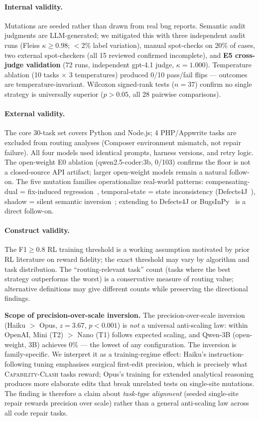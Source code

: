 \documentclass[sigconf,review,anonymous]{acmart}
\newcommand{\ccbench}{\textsc{Capability-Clash}}
\begin{document}
\paragraph{Internal validity.} Mutations are seeded rather than drawn from real bug reports. Semantic audit judgments are LLM-generated; we mitigated this with three independent audit runs (Fleiss $\kappa \geq 0.98$; $<$2\% label variation), manual spot-checks on 20\% of cases, two external spot-checkers (all 15 reviewed confirmed incomplete), and \textbf{E5 cross-judge validation} (72 runs, independent gpt-4.1 judge, $\kappa = 1.000$). Temperature ablation (10 tasks $\times$ 3 temperatures) produced 0/10 pass/fail flips — outcomes are temperature-invariant. Wilcoxon signed-rank tests ($n=37$) confirm no single strategy is universally superior ($p>0.05$, all 28 pairwise comparisons).

\paragraph{External validity.} The core 30-task set covers Python and Node.js; 4 PHP/Appwrite tasks are excluded from routing analyses (Composer environment mismatch, not repair failure). All four models used identical prompts, harness versions, and retry logic. The open-weight E0 ablation (qwen2.5-coder:3b, 0/103) confirms the floor is not a closed-source API artifact; larger open-weight models remain a natural follow-on. The five mutation families operationalize real-world patterns: compensating-dual = fix-induced regression~\cite{yin2011fixes}, temporal-state = state inconsistency (Defects4J~\cite{just2014defects4j}), shadow = silent semantic inversion~\cite{qi2015overfitting}; extending to Defects4J or BugsInPy~\cite{widyasari2020bugsinpy} is a direct follow-on.

\paragraph{Construct validity.} The F1$\geq$0.8 RL training threshold is a working assumption motivated by prior RL literature on reward fidelity; the exact threshold may vary by algorithm and task distribution. The ``routing-relevant task'' count (tasks where the best strategy outperforms the worst) is a conservative measure of routing value; alternative definitions may give different counts while preserving the directional findings.

\textbf{Scope of precision-over-scale inversion.} The precision-over-scale inversion (Haiku $>$ Opus, $z=3.67$, $p<0.001$) is \emph{not} a universal anti-scaling law: within OpenAI, Mini (T2) $>$ Nano (T1) follows expected scaling, and Qwen-3B (open-weight, 3B) achieves 0\% — the lowest of any configuration. The inversion is family-specific. We interpret it as a training-regime effect: Haiku's instruction-following tuning emphasises surgical first-edit precision, which is precisely what \ccbench{} tasks reward; Opus's training for extended analytical reasoning produces more elaborate edits that break unrelated tests on single-site mutations. The finding is therefore a claim about \emph{task-type alignment} (seeded single-site repair rewards precision over scale) rather than a general anti-scaling law across all code repair tasks.
\end{document}

